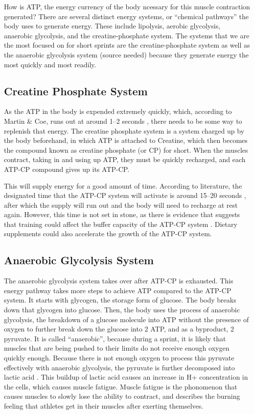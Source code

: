 \documentclass[index]{subfiles}
\begin{document}
How is ATP, the energy currency of the body ncessary for this muscle contraction generated? There are several distinct energy systems, or ``chemical pathways'' the body uses to generate energy. These include lipolysis, aerobic glycolysis, anaerobic glycolysis, and the creatine-phosphate system. The systems that we are the most focused on for short sprints are the creatine-phosphate system as well as the anaerobic glycolysis system (source needed) because they generate energy the most quickly and most readily.

\subsection{Creatine Phosphate System}

As the ATP in the body is expended extremely quickly, which, according to Martin & Coe, runs out at around 1--2 seconds \parencite[pg. 59]{martin1997better}, there needs to be some way to replenish that energy. The creatine phosphate system is a system charged up by the body beforehand, in which ATP is attached to Creatine, which then becomes the compound known as creatine phosphate (or CP) for short. When the muscles contract, taking in and using up ATP, they must be quickly recharged, and each ATP-CP compound gives up its ATP-CP\@.

This will supply energy for a good amount of time. According to literature, the designated time that the ATP-CP system will activate is around 15--20 seconds \parencite[pg. 59]{martin1997better}, after which the supply will run out and the body will need to recharge at rest again. However, this time is not set in stone, as there is evidence that suggests that training could affect the buffer capacity of the ATP-CP system \parencite{sahlinMuscleEnergeticsExplosive2014}. Dietary supplements could also accelerate the growth of the ATP-CP system.

\subsection{Anaerobic Glycolysis System}

The anaerobic glycolysis system takes over after ATP-CP is exhausted. This energy pathway takes more steps to achieve ATP compared to the ATP-CP system. It starts with glycogen, the storage form of glucose. The body breaks down that glycogen into glucose. Then, the body uses the process of anaerobic glycolysis, the breakdown of a glucose molecule into ATP without the presence of oxygen to further break down the glucose into 2 ATP, and as a byproduct, 2 pyruvate. It is called ``anaerobic'', because during a sprint, it is likely that muscles that are being pushed to their limits do not receive enough oxygen quickly enough. Because there is not enough oxygen to process this pyruvate effectively with anaerobic glycolysis, the pyruvate is further decomposed into lactic acid \parencite[24.4]{openstax2013muscle}. This buildup of lactic acid causes an increase in H+ concentration in the cells, which causes muscle fatigue. Muscle fatigue is the phonomenon that causes muscles to slowly lose the ability to contract, and describes the burning feeling that athletes get in their muscles after exerting themselves.
\end{document}
